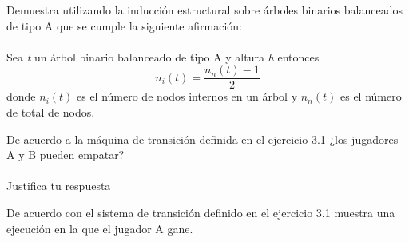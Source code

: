     \begin{exercise}
Demuestra utilizando la inducción estructural sobre árboles binarios balanceados de tipo A que se cumple la siguiente afirmación:\\\\
        Sea \textit{t} un árbol binario balanceado de tipo A y altura \textit{h} entonces
        \[   n_i(t) = \frac{n_n(t) - 1}{2} \] donde $n_i(t)$ es el número de nodos internos en un árbol y $n_n(t)$ es el número de total de nodos.
    \end{exercise}

    \begin{exercise}
        De acuerdo a la máquina de transición definida en el ejercicio 3.1 ¿los jugadores A y B pueden empatar?\\\\
        Justifica tu respuesta
    \end{exercise}

    \begin{exercise}
        De acuerdo con el sistema de transición definido en el ejercicio 3.1 muestra una ejecución en la que el jugador A gane.
    \end{exercise}

